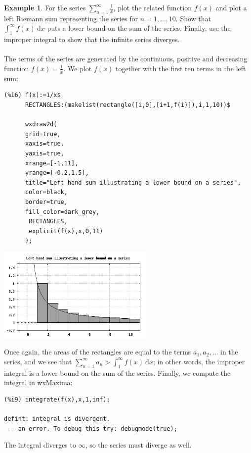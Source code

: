 \documentclass[10.5pt,twoside]{report}
\theoremstyle{definition}
\newtheorem{exmp}{Example}[section]
\begin{document}
\begin{exmp} For the series $ \sum_{n=1}^{\infty} \frac{1}{x}$, plot the related function $f(x)$ and plot a left Riemann sum representing the series for $n=1,\dots,10$.  Show that $\displaystyle \int_{1}^{\infty} f(x)\ \mathrm{d}x$ puts a lower bound on the sum of the series.  Finally, use the improper integral to show that the infinite series diverges.  \\
${}$\\
The terms of the series are generated by the continuous, positive and decreasing function $f(x)=\frac{1}{x}$.  We plot $f(x)$ together with the first ten terms in the left sum:

\begin{verbatim}
(%i6) f(x):=1/x$
      RECTANGLES:(makelist(rectangle([i,0],[i+1,f(i)]),i,1,10))$
      
      wxdraw2d(
      grid=true,
      xaxis=true,
      yaxis=true,
      xrange=[-1,11],
      yrange=[-0.2,1.5],
      title="Left hand sum illustrating a lower bound on a series",
      color=black,
      border=true,
      fill_color=dark_grey,
       RECTANGLES,
       explicit(f(x),x,0,11)
      );
\end{verbatim}

\includegraphics[width=3in]{example_6_3_2_1}

Once again, the areas of the rectangles are equal to the terms $a_1,a_2,\dots $ in the series, and we see that $ \sum_{n=1}^{\infty} a_n > \displaystyle \int_{1}^{\infty} f(x)\ \mathrm{d}x$; in other words, the improper integral is a lower bound on the sum of the series.  Finally, we compute the integral in wxMaxima:

\begin{verbatim}
(%i9) integrate(f(x),x,1,inf);

defint: integral is divergent.
 -- an error. To debug this try: debugmode(true);
\end{verbatim}

The integral diverges to $\infty$, so the series must diverge as well.

\end{exmp}
\end{document}
